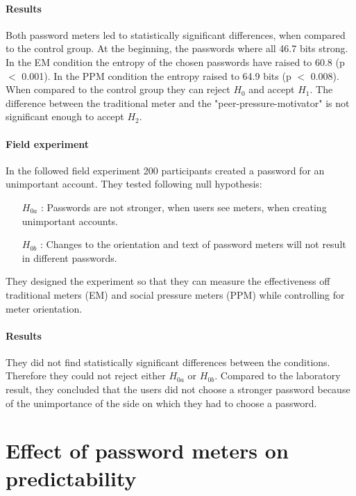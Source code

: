 \documentclass[12pt,a4paper]{article}
\begin{document}
\paragraph{Results}
Both password meters led to statistically significant differences, when compared to the control group. At the beginning, the passwords where all 46.7 bits strong. In the EM condition the entropy of the chosen passwords have raised to 60.8 (p $<$ 0.001). In the PPM condition the entropy raised to 64.9 bits (p $<$ 0.008). 
When compared to the control group they can reject $H _{0}$ and accept $H _{1}$.
The difference between the traditional meter and the "peer-pressure-motivator" is not significant enough to accept $H _{2}$.

\paragraph{Field experiment} 

In the followed field experiment 200 participants created a password for an unimportant account. 
They tested following null hypothesis:
\begin{itemize}
    \item [$ H _{0a}$]: Passwords are not stronger, when users see meters, when creating unimportant accounts.
    \item [$ H _{0b}$]: Changes to the orientation and text of password meters will not result in different passwords.
\end{itemize} 
They designed the experiment so that they can measure the effectiveness off traditional meters (EM) and social pressure meters (PPM) while controlling for meter orientation.


\paragraph{Results}
They did not find statistically significant differences between the conditions. Therefore they could not reject either $ H _{0a}$ or $ H _{0b}$. Compared to the laboratory result, they concluded that the users did not choose a stronger password because of the unimportance of the side on which they had to choose a password.

\section{Effect of password meters on predictability }
\end{document}
